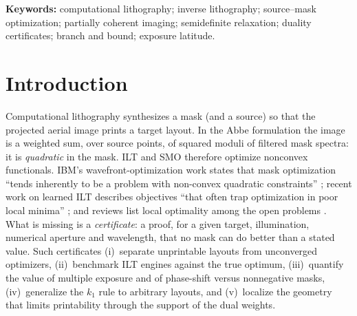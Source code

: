 \documentclass[11pt,a4paper]{article}
\theoremstyle{remark}\newtheorem*{remark}{Remark}
\begin{document}
\begin{abstract}
\noindent\textbf{Conclusions.} The certificates make local optimality checkable, quantify the multi-exposure and phase-shift entitlement, and retain their structure under the vector model and moderate aberrations; their numerical values are entitlements of the thin-mask aerial-image model, necessary but not sufficient for printability.
\end{abstract}
\noindent\textbf{Keywords:} computational lithography; inverse lithography; source--mask optimization; partially coherent imaging; semidefinite relaxation; duality certificates; branch and bound; exposure latitude.

\section{Introduction}
Computational lithography synthesizes a mask (and a source) so that the projected aerial image prints a target layout. In the Abbe formulation the image is a weighted sum, over source points, of squared moduli of filtered mask spectra: it is \emph{quadratic} in the mask. ILT and SMO therefore optimize nonconvex functionals. IBM's wavefront-optimization work states that mask optimization ``tends inherently to be a problem with non-convex quadratic constraints'' \cite{rosenbluth2007}; recent work on learned ILT describes objectives ``that often trap optimization in poor local minima'' \cite{nvidia2026}; and reviews list local optimality among the open problems \cite{pang2021,yang2025}. What is missing is a \emph{certificate}: a proof, for a given target, illumination, numerical aperture and wavelength, that no mask can do better than a stated value. Such certificates (i)~separate unprintable layouts from unconverged optimizers, (ii)~benchmark ILT engines against the true optimum, (iii)~quantify the value of multiple exposure and of phase-shift versus nonnegative masks, (iv)~generalize the $k_1$ rule to arbitrary layouts, and (v)~localize the geometry that limits printability through the support of the dual weights.
\end{document}
